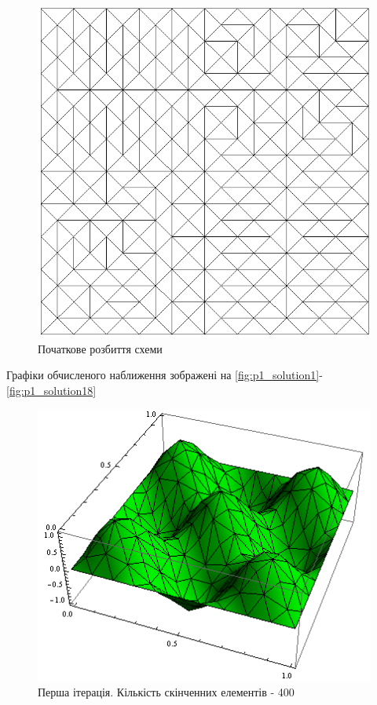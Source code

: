 \begin{figure}[H]
	\centering
    \includegraphics[scale=0.7]{problem1/InitialMesh}
    \caption{Початкове розбиття схеми}
    \label{fig:init_mesh1}
\end{figure}


Графіки обчисленого наближення зображені на \autoref{fig:p1_solution1}-\ref{fig:p1_solution18}


\begin{figure}[H]
	\centering
    \includegraphics[scale=0.9]{problem1/my/solutions/1}
    \caption{Перша ітерація. Кількість скінченних елементів - 400}
    \label{fig:p1_solution1}
\end{figure}

